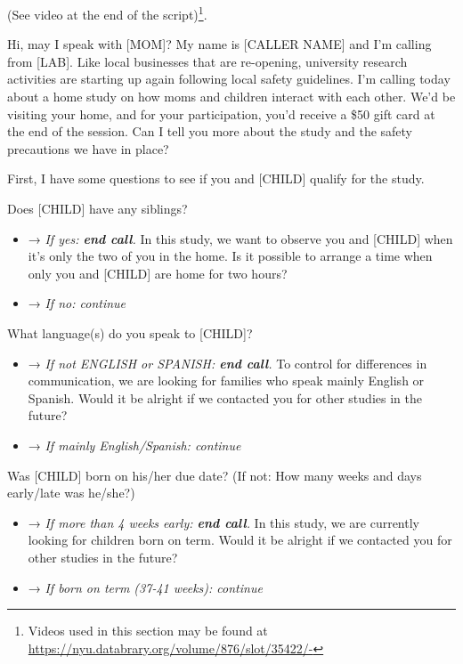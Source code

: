 \documentclass[
  12pt,
]{book}
\providecommand{\tightlist}{%
  \setlength{\itemsep}{0pt}\setlength{\parskip}{0pt}}
\begin{document}
(See video at the end of the script)\footnote{Videos used in this section may be found at \url{https://nyu.databrary.org/volume/876/slot/35422/-}}.

Hi, may I speak with {[}MOM{]}?
My name is {[}CALLER NAME{]} and I'm calling from {[}LAB{]}. Like local businesses that are re-opening, university research activities are starting up again following local safety guidelines. I'm calling today about a home study on how moms and children interact with each other. We'd be visiting your home, and for your participation, you'd receive a \$50 gift card at the end of the session. Can I tell you more about the study and the safety precautions we have in place?

First, I have some questions to see if you and {[}CHILD{]} qualify for the study.

Does {[}CHILD{]} have any siblings?

\begin{itemize}
\tightlist
\item
  → \emph{If yes: \textbf{end call}.} In this study, we want to observe you and {[}CHILD{]} when it's only the two of you in the home. Is it possible to arrange a time when only you and {[}CHILD{]} are home for two hours?
\item
  → \emph{If no: continue}
\end{itemize}

What language(s) do you speak to {[}CHILD{]}?

\begin{itemize}
\tightlist
\item
  → \emph{If not ENGLISH or SPANISH: \textbf{end call}.} To control for differences in communication, we are looking for families who speak mainly English or Spanish. Would it be alright if we contacted you for other studies in the future?
\item
  → \emph{If mainly English/Spanish: continue}
\end{itemize}

Was {[}CHILD{]} born on his/her due date? (If not: How many weeks and days early/late was he/she?)

\begin{itemize}
\tightlist
\item
  → \emph{If more than 4 weeks early: \textbf{end call}.} In this study, we are currently looking for children born on term. Would it be alright if we contacted you for other studies in the future?
\item
  → \emph{If born on term (37-41 weeks): continue}
\end{itemize}
\end{document}
